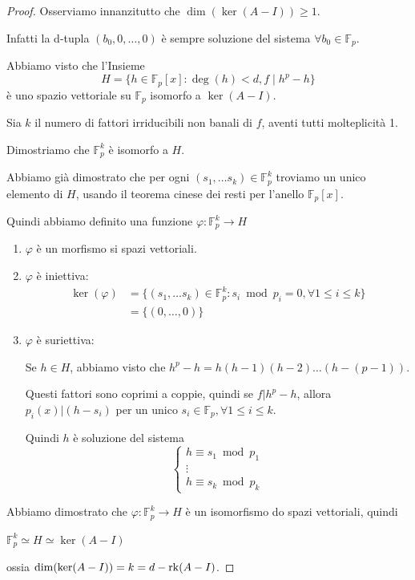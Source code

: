 \documentclass[../main.tex]{subfiles}
\begin{document}
\begin{proof}
    Osserviamo innanzitutto che $\dim(\ker(A - I)) \geq 1$.

    Infatti la d-tupla $(b_0, 0 , \ldots, 0)$ è sempre soluzione del sistema $\forall b_0 \in \mathbb{F}_p$.

    Abbiamo visto che l'Insieme
    \begin{equation*}
        H = \{ h \in \mathbb{F}_p[x] : \deg(h) < d, f \mid h^p - h\}
    \end{equation*}
    è uno spazio vettoriale su $\mathbb{F}_p$ isomorfo a $\ker(A - I)$.

    Sia $k$ il numero di fattori irriducibili non banali di $f$, aventi tutti molteplicità 1.

    Dimostriamo che $\mathbb{F}_p^k$ è isomorfo a $H$.

    Abbiamo già dimostrato che per ogni $(s_1, \ldots s_k) \in \mathbb{F}_p^k$ troviamo un unico elemento di $H$, usando il teorema cinese dei resti per l'anello $\mathbb{F}_p[x]$.

    Quindi abbiamo definito una funzione $\varphi : \mathbb{F}_p^k \rightarrow H$
    \begin{enumerate}[label=\alph*)]
        \item $\varphi$ è un morfismo si spazi vettoriali.
        \item $\varphi$ è iniettiva:
              \begin{align*}
                  \ker(\varphi) & = \{(s_1, \ldots s_k) \in \mathbb{F}_p^k : s_i \bmod p_i = 0, \forall 1 \leq i \leq k\} \\
                                & =\{(0, \ldots , 0)\}
              \end{align*}

        \item $\varphi$ è suriettiva:

              Se $h \in H$, abbiamo visto che $h^p - h = h (h - 1)(h - 2)\ldots(h - (p - 1))$.

              Questi fattori sono coprimi a coppie, quindi se $f | h^p - h$, allora $p_i(x) | (h - s_i)$ per un unico $s_i \in \mathbb{F}_p, \forall 1 \leq i \leq k$.

              Quindi $h$ è soluzione del sistema
              \begin{equation*}
                  \begin{cases}
                      h \equiv s_1 \bmod p_1 \\
                      \vdots                 \\
                      h \equiv s_k \bmod p_k
                  \end{cases}
              \end{equation*}
    \end{enumerate}
    Abbiamo dimostrato che $\varphi : \mathbb{F}_p^k \rightarrow H $ è un isomorfismo do spazi vettoriali, quindi
    \begin{center}
        $\mathbb{F}_p^k \simeq H \simeq \ker(A - I)$
    \end{center}
    ossia $\dim(\ker(A - I)) = k = d - \operatorname{rk}(A - I)$.
\end{proof}
\end{document}
